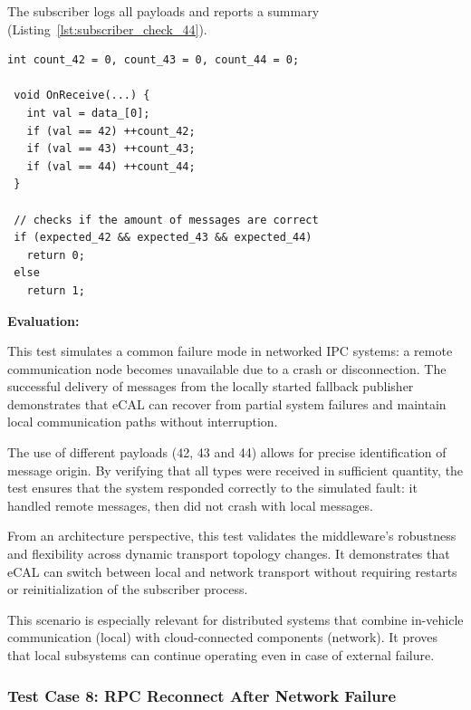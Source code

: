 \vspace{0.4em}
The subscriber logs all payloads and reports a summary (Listing~\ref{lst:subscriber_check_44}).

\begin{lstlisting}[style=cppstyle, caption={Subscriber validation logic for all payloads}, label={lst:subscriber_check_44}, captionpos=b]
 int count_42 = 0, count_43 = 0, count_44 = 0;

 void OnReceive(...) {
   int val = data_[0];
   if (val == 42) ++count_42;
   if (val == 43) ++count_43;
   if (val == 44) ++count_44;
 }
 
 // checks if the amount of messages are correct
 if (expected_42 && expected_43 && expected_44)
   return 0;
 else
   return 1;
\end{lstlisting}

\vspace{0.4em}
\textbf{Evaluation:}

\vspace{0.4em}
This test simulates a common failure mode in networked IPC systems: a remote communication node becomes unavailable due to a crash or disconnection. The successful delivery of messages from the locally started fallback publisher demonstrates that eCAL can recover from partial system failures and maintain local communication paths without interruption.

\vspace{1em}
The use of different payloads (42, 43 and 44) allows for precise identification of message origin. By verifying that all types were received in sufficient quantity, the test ensures that the system responded correctly to the simulated fault: it handled remote messages, then did not crash with local messages.

\vspace{1em}
From an architecture perspective, this test validates the middleware's robustness and flexibility across dynamic transport topology changes. It demonstrates that eCAL can switch between local and network transport without requiring restarts or reinitialization of the subscriber process.

\vspace{1em}
This scenario is especially relevant for distributed systems that combine in-vehicle communication (local) with cloud-connected components (network). It proves that local subsystems can continue operating even in case of external failure.


\subsubsection{Test Case 8: RPC Reconnect After Network Failure}
\label{sec:tc8}

